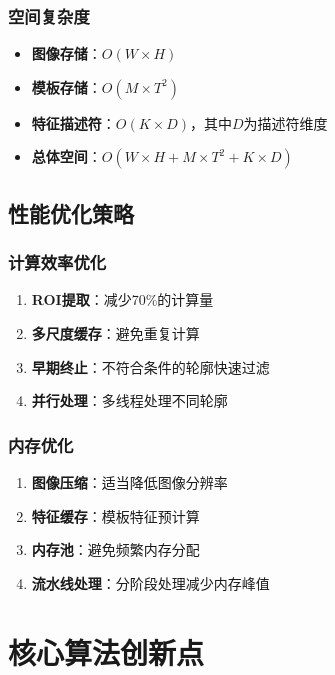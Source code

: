 \documentclass[12pt]{article}
\begin{document}
\subsubsection{空间复杂度}

\begin{itemize}
    \item \textbf{图像存储}：$O(W \times H)$
    \item \textbf{模板存储}：$O(M \times T^2)$
    \item \textbf{特征描述符}：$O(K \times D)$，其中$D$为描述符维度
    \item \textbf{总体空间}：$O(W \times H + M \times T^2 + K \times D)$
\end{itemize}

\subsection{性能优化策略}

\subsubsection{计算效率优化}

\begin{enumerate}
    \item \textbf{ROI提取}：减少70\%的计算量
    \item \textbf{多尺度缓存}：避免重复计算
    \item \textbf{早期终止}：不符合条件的轮廓快速过滤
    \item \textbf{并行处理}：多线程处理不同轮廓
\end{enumerate}

\subsubsection{内存优化}

\begin{enumerate}
    \item \textbf{图像压缩}：适当降低图像分辨率
    \item \textbf{特征缓存}：模板特征预计算
    \item \textbf{内存池}：避免频繁内存分配
    \item \textbf{流水线处理}：分阶段处理减少内存峰值
\end{enumerate}

\section{核心算法创新点}
\end{document}
